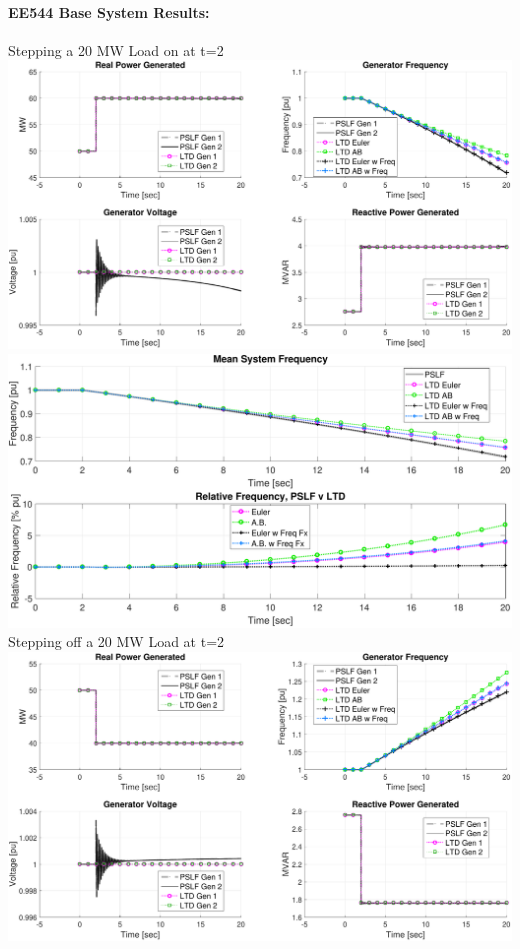 \documentclass[12pt]{article}
\begin{document}
\paragraph{EE544 Base System Results:}Stepping a 20 MW Load on at t=2 \vspace{1em}\\
\includegraphics[width=\linewidth]{noGovExcLoadStepUpsys.pdf}
\includegraphics[width=\linewidth]{noGovExcLoadStepUpfreq}
\pagebreak \\
Stepping off a 20 MW Load at t=2 \vspace{1em}\\
\includegraphics[width=\linewidth]{noGovExcLoadStepDsys}
\end{document}
